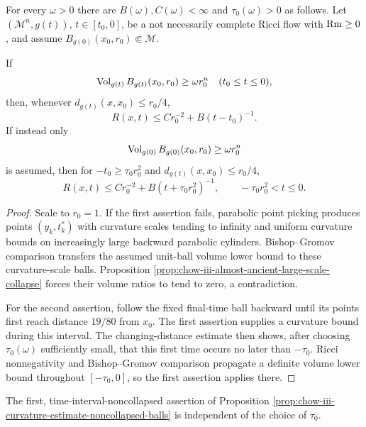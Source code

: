 \begin{proposition}
\label{prop:chow-iii-curvature-estimate-noncollapsed-balls}
For every $\omega>0$ there are $B(\omega),C(\omega)<\infty$ and
$\tau_0(\omega)>0$ as follows.  Let $(\mathcal M^n,g(t))$,
$t\in[t_0,0]$, be a not necessarily complete Ricci flow with $\operatorname{Rm}\ge0$, and
assume $B_{g(0)}(x_0,r_0)\Subset\mathcal M$.

If
\[
 \operatorname{Vol}_{g(t)}B_{g(t)}(x_0,r_0)\ge\omega r_0^n
 \quad(t_0\le t\le0),
\]
then, whenever $d_{g(t)}(x,x_0)\le r_0/4$,
\[
 R(x,t)\le C r_0^{-2}+B(t-t_0)^{-1}.
\]
If instead only
\[
 \operatorname{Vol}_{g(0)}B_{g(0)}(x_0,r_0)\ge\omega r_0^n
\]
is assumed, then for $-t_0\ge\tau_0r_0^2$ and
$d_{g(t)}(x,x_0)\le r_0/4$,
\[
 R(x,t)\le C r_0^{-2}+B(t+\tau_0r_0^2)^{-1},
 \qquad -\tau_0r_0^2<t\le0.
\]
\end{proposition}
\begin{proof}
Scale to $r_0=1$.  If the first assertion fails, parabolic point picking
produces points $(y_k,t_k^*)$ with curvature scales tending to infinity and
uniform curvature bounds on increasingly large backward parabolic
cylinders.  Bishop--Gromov comparison transfers the assumed unit-ball volume
lower bound to these curvature-scale balls.  Proposition
\ref{prop:chow-iii-almost-ancient-large-scale-collapse} forces their volume
ratios to tend to zero, a contradiction.

For the second assertion, follow the fixed final-time ball backward until its
points first reach distance $19/80$ from $x_0$.  The first assertion supplies
a curvature bound during this interval.  The changing-distance estimate then
shows, after choosing $\tau_0(\omega)$ sufficiently small, that this first
time occurs no later than $-\tau_0$.  Ricci nonnegativity and Bishop--Gromov
comparison propagate a definite volume lower bound throughout
$[-\tau_0,0]$, so the first assertion applies there.
\end{proof}

\begin{remark}
\label{rem:chow-iii-curvature-estimate-time-independent}
The first, time-interval-noncollapsed assertion of Proposition
\ref{prop:chow-iii-curvature-estimate-noncollapsed-balls} is independent of
the choice of $\tau_0$.
\end{remark}

